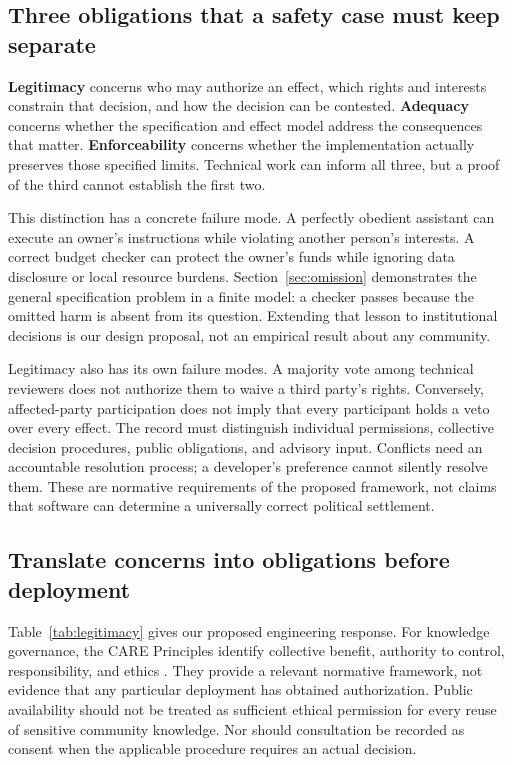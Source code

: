 \documentclass[10pt,twocolumn,letterpaper]{article}
\begin{document}
\subsection{Three obligations that a safety case must keep separate}
\textbf{Legitimacy} concerns who may authorize an effect, which rights and interests constrain that decision, and how the decision can be contested. \textbf{Adequacy} concerns whether the specification and effect model address the consequences that matter. \textbf{Enforceability} concerns whether the implementation actually preserves those specified limits. Technical work can inform all three, but a proof of the third cannot establish the first two.

This distinction has a concrete failure mode. A perfectly obedient assistant can execute an owner's instructions while violating another person's interests. A correct budget checker can protect the owner's funds while ignoring data disclosure or local resource burdens. Section~\ref{sec:omission} demonstrates the general specification problem in a finite model: a checker passes because the omitted harm is absent from its question. Extending that lesson to institutional decisions is our design proposal, not an empirical result about any community.

Legitimacy also has its own failure modes. A majority vote among technical reviewers does not authorize them to waive a third party's rights. Conversely, affected-party participation does not imply that every participant holds a veto over every effect. The record must distinguish individual permissions, collective decision procedures, public obligations, and advisory input. Conflicts need an accountable resolution process; a developer's preference cannot silently resolve them. These are normative requirements of the proposed framework, not claims that software can determine a universally correct political settlement.

\subsection{Translate concerns into obligations before deployment}
Table~\ref{tab:legitimacy} gives our proposed engineering response. For knowledge governance, the CARE Principles identify collective benefit, authority to control, responsibility, and ethics \cite{carroll}. They provide a relevant normative framework, not evidence that any particular deployment has obtained authorization. Public availability should not be treated as sufficient ethical permission for every reuse of sensitive community knowledge. Nor should consultation be recorded as consent when the applicable procedure requires an actual decision.
\end{document}
